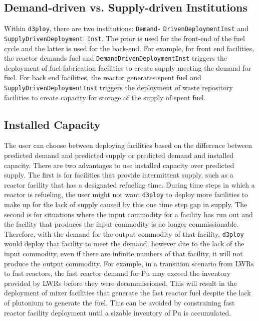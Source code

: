 \documentclass{anstrans}
\newcommand{\deploy}{\texttt{d3ploy}\xspace}%
\begin{document}
\subsection{\textbf{Demand-driven vs. Supply-driven Institutions}}
Within \deploy, there are two institutions: \texttt{Demand-}
\texttt{DrivenDeploymentInst} and \texttt{SupplyDrivenDeployment}. 
\texttt{Inst}. 
The prior is used for the front-end of the fuel cycle and the latter is used 
for the back-end. 
For example, for front end facilities, the reactor demands 
fuel and \texttt{DemandDrivenDeploymentInst} triggers the deployment 
of fuel fabrication facilities to create supply meeting the demand 
for fuel. 
For back end facilities, the reactor generates spent fuel 
and \texttt{SupplyDrivenDeploymentInst} triggers the deployment of 
waste repository facilities to create capacity for storage of the supply 
of spent fuel. 

\subsection{\textbf{Installed Capacity}}
The user can choose between deploying facilities based on the difference 
between predicted demand and predicted supply or predicted demand and 
installed capacity. 
There are two advantages to use installed capacity over predicted 
supply. 
The first is for facilities that provide intermittent supply, such as a 
reactor facility that has a designated refueling time. 
During time steps in which a reactor is refueling, the user might not 
want \deploy to deploy more facilities to make up for the lack of supply
caused by this one time step gap in supply. 
The second is for situations where the input commodity for a facility has
run out and the facility that produces the input commodity 
is no longer commissionable. 
Therefore, with the demand for the output commodity of that facility, \deploy
would deploy that facility to meet the demand, however due to the lack of 
the input commodity, even if there are infinite numbers of that facility, 
it will not produce the output commodity. 
For example, in a transition scenario from LWRs to fast reactors, the fast 
reactor demand for Pu may exceed the inventory provided by LWRs before 
they were decommissioned. 
This will result in the deployment of mixer facilities that generate the 
fast reactor fuel despite the lack of plutonium to generate the fuel. 
This can be avoided by constraining fast reactor facility deployment 
until a sizable inventory of Pu is accumulated. 
\end{document}
